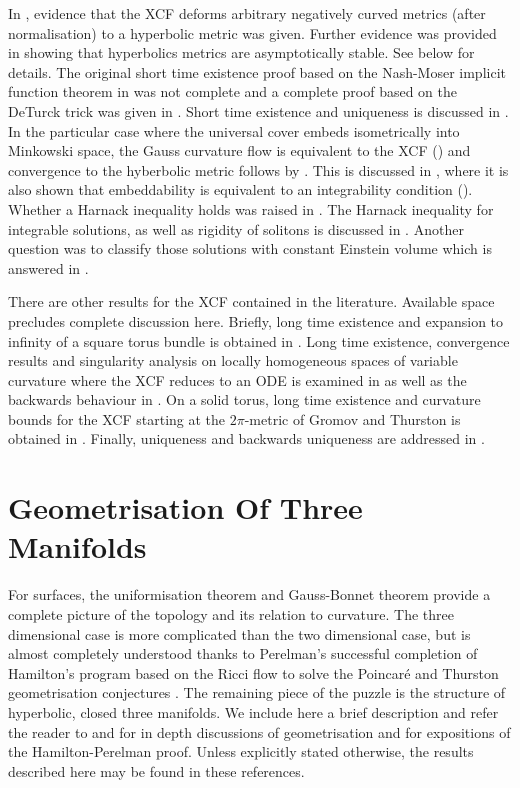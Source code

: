 \documentclass{cambridge7a}
\renewcommand{\~}{\tilde}
\renewcommand{\-}{\bar}
\newcommand{\8}{\infty}
\begin{document}
In \cite{MR2055396}, evidence that the XCF deforms arbitrary negatively curved metrics (after normalisation) to a hyperbolic metric was given. Further evidence was provided in \cite{MR2448593} showing that hyperbolics metrics are asymptotically stable. See  below for details. The original short time existence proof based on the Nash-Moser implicit function theorem in \cite{MR2055396} was not complete and a complete proof based on the DeTurck trick was given in \cite{MR2207496}. Short time existence and uniqueness is discussed in . In the particular case where the universal cover embeds isometrically into Minkowski space, the Gauss curvature flow is equivalent to the XCF () and convergence to the hyberbolic metric follows by \cite{MR3344442}. This is discussed in , where it is also shown that embeddability is equivalent to an integrability condition (). Whether a Harnack inequality holds was raised in \cite{MR2055396}. The Harnack inequality for integrable solutions, as well as rigidity of solitons is discussed in . Another question was to classify those solutions with constant Einstein volume which is answered in .

There are other results for the XCF contained in the literature. Available space precludes complete discussion here. Briefly, long time existence and expansion to infinity of a square torus bundle is obtained in \cite{MR2222245}. Long time existence, convergence results and singularity analysis on locally homogeneous spaces of variable curvature where the XCF reduces to an ODE is examined in \cite{MR2407107,MR2653711,MR2426751} as well as the backwards behaviour in \cite{MR2601352}. On a solid torus, long time existence and curvature bounds for the XCF starting at the \(2\pi\)-metric of Gromov and Thurston is obtained in \cite{MR2602839}. Finally, uniqueness and backwards uniqueness are addressed in \cite{MR3575926,MR3544962}.

\section{Geometrisation Of Three Manifolds}
\label{sec:geometrisation}

For surfaces, the uniformisation theorem and Gauss-Bonnet theorem provide a complete picture of the topology and its relation to curvature. The three dimensional case is more complicated than the two dimensional case, but is almost completely understood thanks to Perelman's successful completion \cite{2003math......7245P,2003math......3109P,2002math.....11159P} of Hamilton's program based on the Ricci flow \cite{Hamilton:/1982} to solve the Poincar\'e and Thurston geometrisation conjectures \cite{MR648524}. The remaining piece of the puzzle is the structure of hyperbolic, closed three manifolds. We include here a brief description and refer the reader to \cite{MR705527} and \cite{MR1435975} for in depth discussions of geometrisation and \cite{MR3186136,MR2334563,MR2460872} for expositions of the Hamilton-Perelman proof. Unless explicitly stated otherwise, the results described here may be found in these references.
\end{document}
